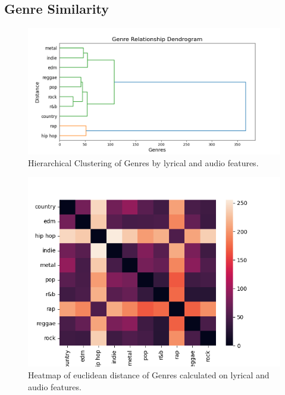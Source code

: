 \subsection{Genre Similarity}

\begin{center}
\begin{figure}[H]
  \centering
  \includegraphics[width=6in]{img/genres_dendrogram.png}
  \caption{Hierarchical Clustering of Genres by lyrical and audio features.}
  \label{Figure:dendrogram_spotify_features}
\end{figure}
\end{center}

\begin{center}
\begin{figure}[H]
  \centering
  \includegraphics[width=6in]{img/genres_similarity_heatmap.png}
  \caption{Heatmap of euclidean distance of Genres calculated on lyrical and
  audio features.}
  \label{Figure:dendrogram_spotify_features}
\end{figure}
\end{center}


